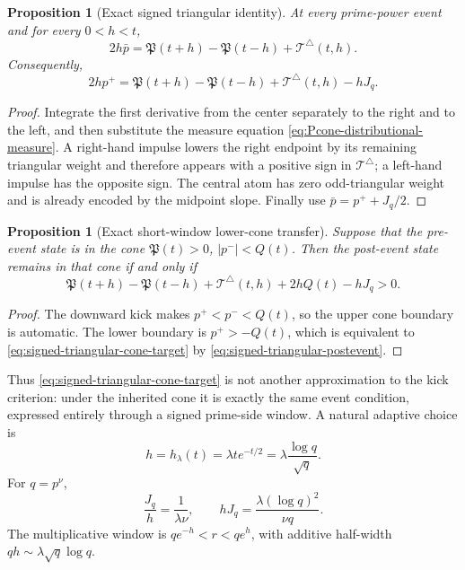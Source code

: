 \documentclass[11pt,a4paper]{article}
\numberwithin{equation}{section}
\newtheorem{proposition}[theorem]{Proposition}
\theoremstyle{definition}
\begin{document}
\begin{proposition}[Exact signed triangular identity]
\label{prop:signed-triangular-identity}
At every prime-power event and for every \(0<h<t\),
\begin{equation}\label{eq:signed-triangular-midpoint}
  \boxed{
  2h\bar p
  =\mathfrak P(t+h)-\mathfrak P(t-h)
   +\mathcal T^\triangle(t,h).
  }
\end{equation}
Consequently,
\begin{equation}\label{eq:signed-triangular-postevent}
  \boxed{
  2hp^+
  =\mathfrak P(t+h)-\mathfrak P(t-h)
   +\mathcal T^\triangle(t,h)-hJ_q.
  }
\end{equation}
\end{proposition}

\begin{proof}
Integrate the first derivative from the center separately to the right and
to the left, and then substitute the measure equation
\eqref{eq:Pcone-distributional-measure}.  A right-hand impulse lowers the
right endpoint by its remaining triangular weight and therefore appears
with a positive sign in \(\mathcal T^\triangle\); a left-hand impulse has the
opposite sign.  The central atom has zero odd-triangular weight and is already
encoded by the midpoint slope.  Finally use
\(\bar p=p^++J_q/2\).
\end{proof}

\begin{proposition}[Exact short-window lower-cone transfer]
\label{prop:signed-triangular-cone-transfer}
Suppose that the pre-event state is in the cone
\(\mathfrak P(t)>0\), \(|p^-|<Q(t)\).  Then the post-event state remains in
that cone if and only if
\begin{equation}\label{eq:signed-triangular-cone-target}
  \boxed{
  \mathfrak P(t+h)-\mathfrak P(t-h)
  +\mathcal T^\triangle(t,h)
  +2hQ(t)-hJ_q>0.
  }
\end{equation}
\end{proposition}

\begin{proof}
The downward kick makes \(p^+<p^-<Q(t)\), so the upper cone boundary is
automatic.  The lower boundary is \(p^+>-Q(t)\), which is equivalent to
\eqref{eq:signed-triangular-cone-target} by
\eqref{eq:signed-triangular-postevent}.
\end{proof}

Thus \eqref{eq:signed-triangular-cone-target} is not another approximation to
the kick criterion: under the inherited cone it is exactly the same event
condition, expressed entirely through a signed prime-side window.  A natural
adaptive choice is
\begin{equation}\label{eq:adaptive-triangular-window}
  h=h_\lambda(t)=\lambda t e^{-t/2}
  =\lambda\frac{\log q}{\sqrt q}.
\end{equation}
For \(q=p^\nu\),
\begin{equation}\label{eq:adaptive-window-jump-scale}
  \frac{J_q}{h}=\frac1{\lambda\nu},
  \qquad
  hJ_q=\frac{\lambda(\log q)^2}{\nu q}.
\end{equation}
The multiplicative window is \(qe^{-h}<r<qe^h\), with additive half-width
\(qh\sim\lambda\sqrt q\log q\).
\end{document}
